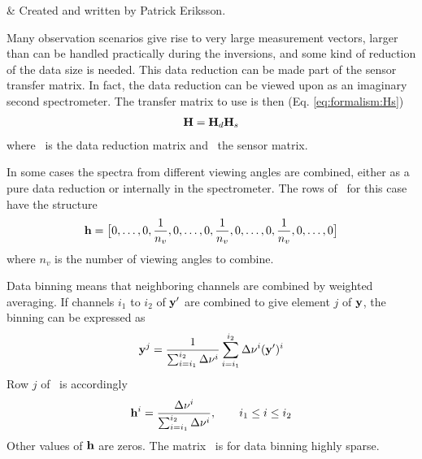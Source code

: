 %
%
 \label{sec:red}


%
%
 & Created and written by Patrick Eriksson.\\
\stophistory


%
%
%



%
%
Many observation scenarios give rise to very large measurement
vectors, larger than can be handled practically during the inversions,
and some kind of reduction of the data size is needed. This data
reduction can be made part of the sensor transfer matrix. In fact, the
data reduction can be viewed upon as an imaginary second spectrometer.
The transfer matrix to use is then (Eq. \ref{eq:formalism:Hs})
\begin{eqnarray}
  \mathbf{H} = \mathbf{H}_d \mathbf{H}_s  \nonumber
\end{eqnarray}
where \Hd\ is the data reduction matrix and \Hs\ the sensor matrix.



 \label{sec:red:view}
 
 In some cases the spectra from different viewing angles are combined,
 either as a pure data reduction or internally in the spectrometer.
 The rows of \Hd\ for this case have the structure
 \begin{equation}
   \mathbf{h} = \big[ 0,\dots,0,\frac{1}{n_v},0,\dots,0,\frac{1}{n_v},0,\dots,0,\frac{1}{n_v},0,\dots,0\big]
 \end{equation}
 where $n_v$ is the number of viewing angles to combine.


 \label{sec:red:binning}
 
 Data binning means that neighboring channels are combined by
 weighted averaging. If channels $i_1$ to $i_2$ of $\mathbf{y}'$ are combined to
 give element $j$ of $\mathbf{y}$, the binning can be expressed as
 \begin{equation}
   \mathbf{y}^j = \frac{1}{\sum_{i=i_1}^{i_2}{\Delta \nu^i}} \sum_{i=i_1}^{i_2}{\Delta \nu^i (\mathbf{y}')^i}
 \end{equation}
 Row $j$ of \Hd\ is accordingly
 \begin{equation}
   \mathbf{h}^i = \frac{\Delta \nu^i}{\sum_{i=i_1}^{i_2}{\Delta \nu^i}}, \qquad
    i_1\leq i \leq i_2
 \end{equation}
 Other values of $\mathbf{h}$ are zeros. The matrix \Hd\ is for data
 binning highly sparse.



